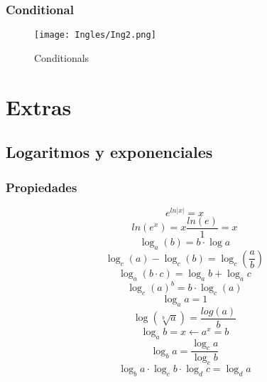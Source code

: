 \documentclass[
	12pt, %
	fleqn, %
	a4paper, %
	oneside, %
]{LegrandOrangeBook}
\begin{document}
\section{Conditional}
\begin{figure}[H]
\centering
\texttt{[image: Ingles/Ing2.png]}
\caption{Conditionals}
\end{figure}
\part{Extras}
\chapter{Logaritmos y exponenciales}
\section{Propiedades}
\begin{equation}\label{art:expaln}
e^{ln|x|}=x
\end{equation}
\begin{equation}\label{art:lnaexp}
ln(e^x)=x\frac{ln(e)}{1}=x
\end{equation}
\begin{equation}\label{art:logaritmos}
\log_a(b)=b\cdot\log a
\end{equation}
\begin{equation}\label{art:logdiv}
\log_c(a)-\log_c(b)=\log_c\left(\frac{a}{b}\right)
\end{equation}
\begin{equation}
\label{art:logmulti}
\log_a(b\cdot c)=\log_ab+\log_ac
\end{equation}
\begin{equation}\label{art:logexp}
\log_c(a)^b=b\cdot\log_c(a)
\end{equation}
\begin{equation}
\label{art:log1}
\log_aa=1
\end{equation}
\begin{equation}\label{art:raizlog}
\log\left(\sqrt[b]{a}\right)=\frac{log(a)}{b}
\end{equation}
\begin{equation}\label{art:log y expo}
\log_ab=x\leftarrow a^x=b
\end{equation}
\begin{equation}
\label{art:logcambio de bse}
\log_ba=\frac{\log_ca}{\log_cb}
\end{equation}
\begin{equation}
\label{art:log cadena}
\log_ba\cdot\log_cb\cdot\log_dc=\log_da
\end{equation}
\end{document}
